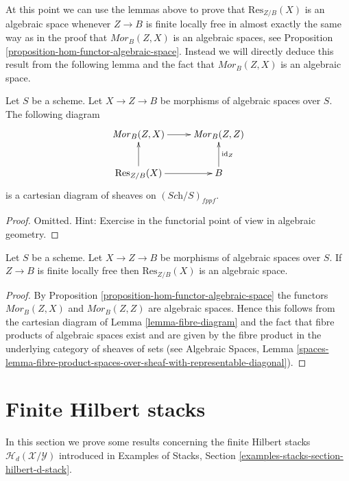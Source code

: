 \noindent
At this point we can use the lemmas above to prove that $\text{Res}_{Z/B}(X)$
is an algebraic space whenever $Z \to B$ is finite locally free in almost
exactly the same way as in the proof that $\mathit{Mor}_B(Z, X)$ is an
algebraic spaces, see
Proposition \ref{proposition-hom-functor-algebraic-space}.
Instead we will directly deduce this result from the following lemma
and the fact that $\mathit{Mor}_B(Z, X)$ is an algebraic space.

\begin{lemma}
\label{lemma-fibre-diagram}
Let $S$ be a scheme. Let $X \to Z \to B$ be morphisms of
algebraic spaces over $S$. The following diagram
$$
\xymatrix{
\mathit{Mor}_B(Z, X) \ar[r] & \mathit{Mor}_B(Z, Z) \\
\text{Res}_{Z/B}(X) \ar[r] \ar[u] & B \ar[u]_{\text{id}_Z}
}
$$
is a cartesian diagram of sheaves on $(\textit{Sch}/S)_{fppf}$.
\end{lemma}

\begin{proof}
Omitted. Hint: Exercise in the functorial point of view in algebraic
geometry.
\end{proof}

\begin{proposition}
\label{proposition-restriction-of-scalars-algebraic-space}
Let $S$ be a scheme. Let $X \to Z \to B$ be morphisms of
algebraic spaces over $S$. If $Z \to B$ is finite locally free
then $\text{Res}_{Z/B}(X)$ is an algebraic space.
\end{proposition}

\begin{proof}
By
Proposition \ref{proposition-hom-functor-algebraic-space}
the functors $\mathit{Mor}_B(Z, X)$ and $\mathit{Mor}_B(Z, Z)$
are algebraic spaces. Hence this follows from the cartesian
diagram of
Lemma \ref{lemma-fibre-diagram}
and the fact that fibre products of algebraic spaces exist and
are given by the fibre product in the underlying category of
sheaves of sets (see
Algebraic Spaces, Lemma
\ref{spaces-lemma-fibre-product-spaces-over-sheaf-with-representable-diagonal}).
\end{proof}






\section{Finite Hilbert stacks}
\label{section-finite-hilbert-stacks}

\noindent
In this section we prove some results concerning the finite
Hilbert stacks $\mathcal{H}_d(\mathcal{X}/\mathcal{Y})$
introduced in
Examples of Stacks, Section \ref{examples-stacks-section-hilbert-d-stack}.

